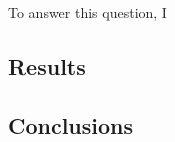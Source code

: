 To answer this question, I 

\subsection{Results}%
\label{sub:results}

\subsection{Conclusions}%
\label{sub:conclusions}





